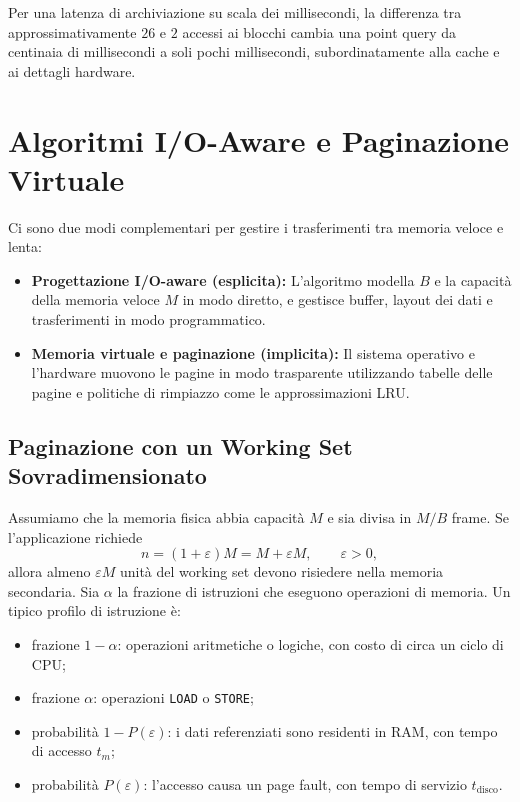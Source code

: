 Per una latenza di archiviazione su scala dei millisecondi, la differenza tra approssimativamente $26$ e $2$ accessi ai blocchi cambia una point query da centinaia di millisecondi a soli pochi millisecondi, subordinatamente alla cache e ai dettagli hardware.

\section{Algoritmi I/O-Aware e Paginazione Virtuale}
\label{sec:paging}

Ci sono due modi complementari per gestire i trasferimenti tra memoria veloce e lenta:
\begin{itemize}
  \item \textbf{Progettazione I/O-aware (esplicita):} L'algoritmo modella $B$ e la capacità della memoria veloce $M$ in modo diretto, e gestisce buffer, layout dei dati e trasferimenti in modo programmatico.
  \item \textbf{Memoria virtuale e paginazione (implicita):} Il sistema operativo e l'hardware muovono le pagine in modo trasparente utilizzando tabelle delle pagine e politiche di rimpiazzo come le approssimazioni LRU.
\end{itemize}

\subsection{Paginazione con un Working Set Sovradimensionato}
\label{subsec:paging-model}

Assumiamo che la memoria fisica abbia capacità $M$ e sia divisa in $M/B$ frame. Se l'applicazione richiede
\[
  n=(1+\varepsilon)M=M+\varepsilon M,
  \qquad \varepsilon>0,
\]
allora almeno $\varepsilon M$ unità del working set devono risiedere nella memoria secondaria. Sia $\alpha$ la frazione di istruzioni che eseguono operazioni di memoria. Un tipico profilo di istruzione è:

\begin{itemize}
  \item frazione $1-\alpha$: operazioni aritmetiche o logiche, con costo di circa un ciclo di CPU;
  \item frazione $\alpha$: operazioni \texttt{LOAD} o \texttt{STORE};
  \item probabilità $1-P(\varepsilon)$: i dati referenziati sono residenti in RAM, con tempo di accesso $t_m$;
  \item probabilità $P(\varepsilon)$: l'accesso causa un page fault, con tempo di servizio $t_{\mathrm{disco}}$.
\end{itemize}

